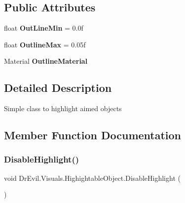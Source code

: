 \subsection*{Public Attributes}
\begin{DoxyCompactItemize}
\item 
\mbox{\label{class_dr_evil_1_1_visuals_1_1_highightable_object_a42d4de1f0af915d44f04d00319be2388}} 
float {\bfseries Out\+Line\+Min} = 0.\+0f
\item 
\mbox{\label{class_dr_evil_1_1_visuals_1_1_highightable_object_ab91f29ea399951a14f924b079e3e7a4b}} 
float {\bfseries Outline\+Max} = 0.\+05f
\item 
\mbox{\label{class_dr_evil_1_1_visuals_1_1_highightable_object_ac0cd769e08f6d91f9ad2f880d2ac1943}} 
Material {\bfseries Outline\+Material}
\end{DoxyCompactItemize}


\subsection{Detailed Description}
Simple class to highlight aimed objects 



\subsection{Member Function Documentation}
\mbox{\label{class_dr_evil_1_1_visuals_1_1_highightable_object_a6b59e8e3ac556d65eb93a304be07c18f}} 
\subsubsection{\texorpdfstring{Disable\+Highlight()}{DisableHighlight()}}
{\footnotesize\ttfamily void Dr\+Evil.\+Visuals.\+Highightable\+Object.\+Disable\+Highlight (\begin{DoxyParamCaption}{ }\end{DoxyParamCaption})\hspace{0.3cm}{\ttfamily [inline]}}



